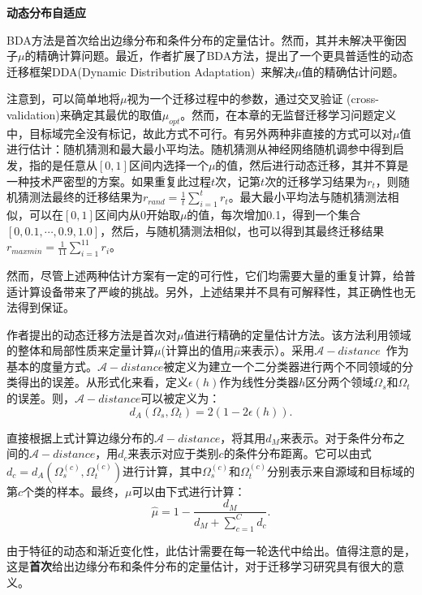 \textbf{动态分布自适应}

BDA方法是首次给出边缘分布和条件分布的定量估计。然而，其并未解决平衡因子$\mu$的精确计算问题。最近，作者扩展了BDA方法，提出了一个更具普适性的动态迁移框架DDA(Dynamic Distribution Adaptation)~\cite{wang2019transfer}来解决$\mu$值的精确估计问题。

注意到，可以简单地将$\mu$视为一个迁移过程中的参数，通过交叉验证 (cross-validation)来确定其最优的取值$\mu_{opt}$。然而，在本章的无监督迁移学习问题定义中，目标域完全没有标记，故此方式不可行。有另外两种非直接的方式可以对$\mu$值进行估计：随机猜测和最大最小平均法。随机猜测从神经网络随机调参中得到启发，指的是任意从$[0,1]$区间内选择一个$\mu$的值，然后进行动态迁移，其并不算是一种技术严密型的方案。如果重复此过程$t$次，记第$t$次的迁移学习结果为$r_t$，则随机猜测法最终的迁移结果为$r_{rand} = \frac{1}{t} \sum_{i=1}^{t} r_t$。最大最小平均法与随机猜测法相似，可以在$[0,1]$区间内从0开始取$\mu$的值，每次增加0.1，得到一个集合$[0,0.1,\cdots,0.9,1.0]$，然后，与随机猜测法相似，也可以得到其最终迁移结果$r_{maxmin}=\frac{1}{11} \sum_{i=1}^{11} r_i$。

然而，尽管上述两种估计方案有一定的可行性，它们均需要大量的重复计算，给普适计算设备带来了严峻的挑战。另外，上述结果并不具有可解释性，其正确性也无法得到保证。

作者提出的动态迁移方法是首次对$\mu$值进行精确的定量估计方法。该方法利用领域的整体和局部性质来定量计算$\mu$(计算出的值用$\hat{\mu}$来表示）。采用$\mathcal{A}-distance$~\cite{ben2007analysis}作为基本的度量方式。$\mathcal{A}-distance$被定义为建立一个二分类器进行两个不同领域的分类得出的误差。从形式化来看，定义$\epsilon(h)$作为线性分类器$h$区分两个领域$\Omega_s$和$\Omega_t$的误差。则，$\mathcal{A}-distance$可以被定义为：
\begin{equation}
d_A(\Omega_s,\Omega_t) = 2(1 - 2 \epsilon(h)).
\end{equation}

直接根据上式计算边缘分布的$\mathcal{A}-distance$，将其用$d_M$来表示。对于条件分布之间的$\mathcal{A}-distance$，用$d_c$来表示对应于类别$c$的条件分布距离。它可以由式$d_c = d_A(\Omega^{(c)}_s,\Omega^{(c)}_t)$进行计算，其中$\Omega^{(c)}_s$和$\Omega^{(c)}_t$分别表示来自源域和目标域的第$c$个类的样本。最终，$\mu$可以由下式进行计算：
\begin{equation}
\label{eq-meda-mu}
\hat{\mu} = 1 - \frac{d_M}{d_M + \sum_{c=1}^{C} d_c}.
\end{equation}

由于特征的动态和渐近变化性，此估计需要在每一轮迭代中给出。值得注意的是，这是\textbf{首次}给出边缘分布和条件分布的定量估计，对于迁移学习研究具有很大的意义。

